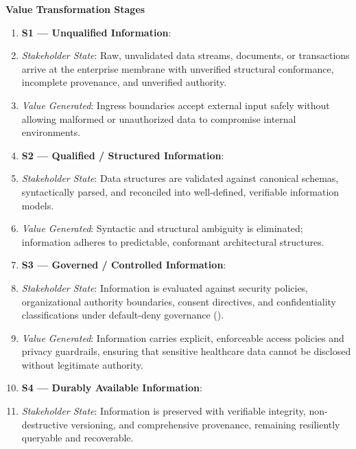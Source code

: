 \par\medskip\textbf{Value Transformation Stages}\par


\begin{enumerate}


\item \textbf{S1 — Unqualified Information}:

\item \emph{Stakeholder State}: Raw, unvalidated data streams, documents, or transactions arrive at the enterprise membrane with unverified structural conformance, incomplete provenance, and unverified authority.

\item \emph{Value Generated}: Ingress boundaries accept external input safely without allowing malformed or unauthorized data to compromise internal environments.

\item \textbf{S2 — Qualified / Structured Information}:

\item \emph{Stakeholder State}: Data structures are validated against canonical schemas, syntactically parsed, and reconciled into well-defined, verifiable information models.

\item \emph{Value Generated}: Syntactic and structural ambiguity is eliminated; information adheres to predictable, conformant architectural structures.

\item \textbf{S3 — Governed / Controlled Information}:

\item \emph{Stakeholder State}: Information is evaluated against security policies, organizational authority boundaries, consent directives, and confidentiality classifications under default-deny governance (\texttt{}).

\item \emph{Value Generated}: Information carries explicit, enforceable access policies and privacy guardrails, ensuring that sensitive healthcare data cannot be disclosed without legitimate authority.

\item \textbf{S4 — Durably Available Information}:

\item \emph{Stakeholder State}: Information is preserved with verifiable integrity, non-destructive versioning, and comprehensive provenance, remaining resiliently queryable and recoverable.


\end{enumerate}
